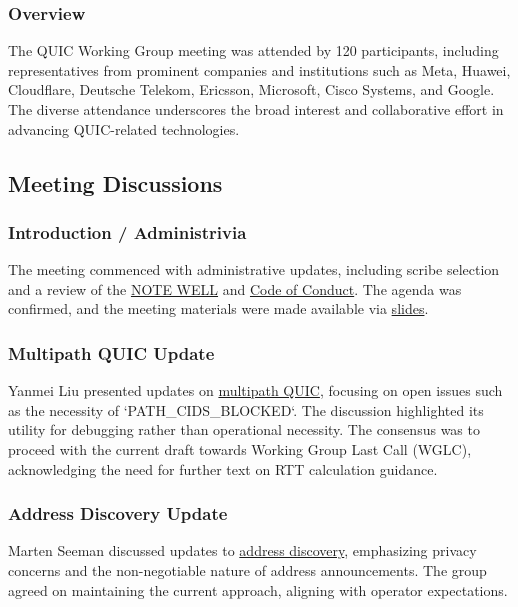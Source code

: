 \documentclass{article}
\begin{document}
\subsubsection{Overview}
The QUIC Working Group meeting was attended by 120 participants, including representatives from prominent companies and institutions such as Meta, Huawei, Cloudflare, Deutsche Telekom, Ericsson, Microsoft, Cisco Systems, and Google. The diverse attendance underscores the broad interest and collaborative effort in advancing QUIC-related technologies.

\subsection{Meeting Discussions}

\subsubsection{Introduction / Administrivia}
The meeting commenced with administrative updates, including scribe selection and a review of the \href{https://www.ietf.org/about/note-well.html}{NOTE WELL} and \href{https://www.rfc-editor.org/rfc/rfc7154.html}{Code of Conduct}. The agenda was confirmed, and the meeting materials were made available via \href{https://github.com/quicwg/wg-materials/blob/main/ietf122/chairs.pdf}{slides}.

\subsubsection{Multipath QUIC Update}
Yanmei Liu presented updates on \href{https://datatracker.ietf.org/doc/html/draft-ietf-quic-multipath}{multipath QUIC}, focusing on open issues such as the necessity of `PATH\_CIDS\_BLOCKED`. The discussion highlighted its utility for debugging rather than operational necessity. The consensus was to proceed with the current draft towards Working Group Last Call (WGLC), acknowledging the need for further text on RTT calculation guidance.

\subsubsection{Address Discovery Update}
Marten Seeman discussed updates to \href{https://datatracker.ietf.org/doc/draft-ietf-quic-address-discovery/}{address discovery}, emphasizing privacy concerns and the non-negotiable nature of address announcements. The group agreed on maintaining the current approach, aligning with operator expectations.
\end{document}
